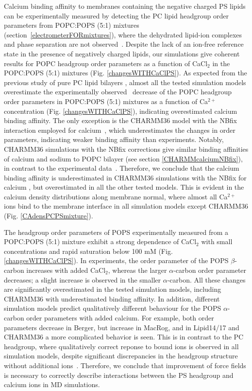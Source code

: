 \documentclass[aps,prl,superscriptaddress,twocolumn]{revtex4}
\begin{document}
Calcium binding affinity to membranes containing the negative charged PS lipids can be
experimentally measured by detecting the PC lipid headgroup order parameters
from POPC:POPS (5:1) mixtures (section~\ref{electrometerFORmixtures}),
where the dehydrated lipid-ion complexes and phase separation are 
not observed~\cite{feigenson86,mattai89,roux90,roux91}.
Despite the lack of an ion-free reference state
in the presence of negatively charged lipids, our simulations give
coherent results for POPC headgroup order parameters as a function of
CaCl$_2$ in the POPC:POPS (5:1) mixtures (Fig. \ref{changesWITHCaClPS}).
As expected from the previous study of pure PC lipid
bilayers \cite{catte16}, almost all the tested simulation models overestimate the
experimentally observed~\cite{roux90} decrease of the POPC headgroup order parameters
in POPC:POPS (5:1) mixtures as a function of Ca$^{2+}$ concentration (Fig. \ref{changesWITHCaClPS}),
indicating overestimated calcium binding affinity.
The only exception is the CHARMM36 model with the NBfix
interaction employed for calcium~\cite{kim16}, which underestimates the changes in order parameters, 
indicating weaker binding affinity than experiments.
Notably, CHARMM36 simulations with the NBfix corrections \cite{venable13,kim16} give similar binding affinities of
calcium and sodium to POPC bilayer (see section \ref{CHARMMcalciumNBfix}), in contrast to the experimental 
data~\cite{cevc90,akutsu81,altenbach84}. Therefore, we conclude that the calcium binding affinity
is underestimated in CHARMM36 simulations with the NBfix for calcium \cite{kim16}, but overestimated 
in all the other tested models. This is evident in the calcium density distributions
along membrane normal, where almost all Ca$^{2+}$ ions bind to the membrane interface in
all simulation models except CHARMM36 (Fig. \ref{CAdensPCPSmixture}).


The headgroup order parameters of POPS experimentally measured from a POPC:POPS (5:1) mixture
exhibit a strong dependence of CaCl$_2$ with small concentrations and rapid saturation
below 100 mM (Fig. \ref{changesWITHCaClPS}).
In experiments, the order parameter of the POPS $\beta$-carbon increases with added CaCl$_2$,
whereas the larger $\alpha$-carbon order parameter decreases; a slight increase is observed in
the smaller $\alpha$-carbon. All these changes are significantly overestimated in the
tested simulation models, including CHARMM36 with underestimated binding affinity.
In addition, different simulation models predict qualitatively different behaviour
for the POPS $\alpha$-carbon order parameters with added calcium.
For example, both order parameters decrease in Berger, but increase
in MacRog, and in Lipid14/17 and CHARMM36 a more complicated behavior is seen.
This is in contrast to the PC headgroup, where
qualitatively correct reponse to bound ions is observed
in all simulation models, despite significant discrepancies in the headgroup
structure without additional ions~\cite{catte16}. Therefore, we conclude that
improvement of force fields is necessary to correctly describe interactions between the
PS headgroup and calcium ions in MD simulations.
\end{document}
